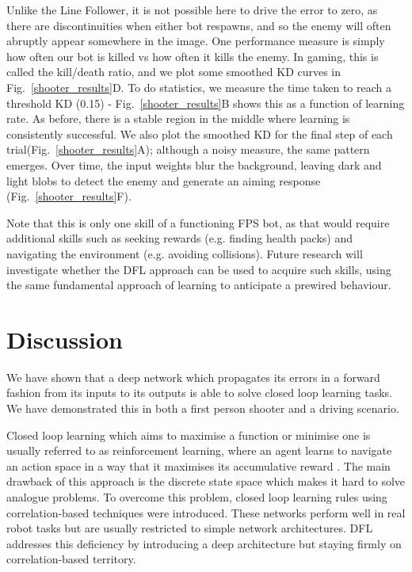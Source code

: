 \documentclass{llncs}
\begin{document}
Unlike the Line Follower, it is not possible here to drive the error
to zero, as there are discontinuities when either bot respawns, and so
the enemy will often abruptly appear somewhere in the image. One
performance measure is simply how often our bot is killed vs how often
it kills the enemy. In gaming, this is called the kill/death ratio,
and we plot some smoothed KD curves in Fig.~\ref{shooter_results}D. To
do statistics, we measure the time taken to reach a threshold KD (0.15) -
Fig.~\ref{shooter_results}B shows this as a function of learning
rate. As before, there is a stable region in the middle where learning
is consistently successful. We also plot the smoothed KD for the final
step of each trial(Fig.~\ref{shooter_results}A); although a noisy
measure, the same pattern emerges. Over time, the input weights blur
the background, leaving dark and light blobs to detect the enemy and
generate an aiming response (Fig.~\ref{shooter_results}F).

Note that this is only one skill of a functioning FPS bot, as that would
require additional skills such as seeking rewards (e.g. finding health packs) and
navigating the environment (e.g. avoiding collisions). Future research
will investigate whether the DFL approach can be used to acquire such
skills, using the same fundamental approach of learning to anticipate
a prewired behaviour.


\section{Discussion}
We have shown that a deep network which propagates its errors in a forward
fashion from its inputs to its outputs is able to solve closed loop
learning tasks. We have demonstrated this in both a first person
shooter and a driving scenario.

Closed loop learning which aims to maximise a function or minimise one
is usually referred to as reinforcement learning, where an agent learns to
navigate an action space in a way that it maximises its accumulative
reward \cite{Dayan1992}. The main drawback of this approach
is the discrete state space which makes it hard to solve analogue
problems. To overcome this problem, closed loop learning rules using
correlation-based techniques \cite{Verschure98summary} were introduced.
These networks perform well in real robot tasks but are usually restricted to 
simple network architectures. DFL addresses this
deficiency by introducing a deep architecture but staying firmly
on correlation-based territory.
\end{document}
